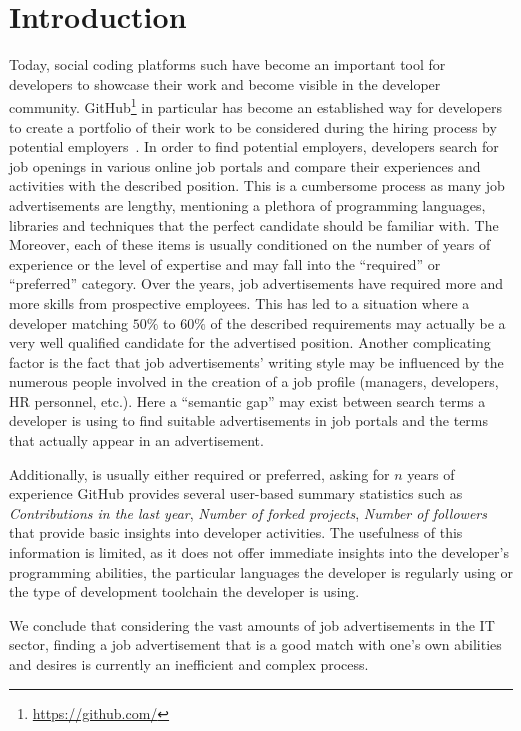 \documentclass{sig-alternate}
\begin{document}


\section{Introduction}


Today, social coding platforms such have become an important tool for developers to showcase their work and become visible in the developer community. GitHub\footnote{\url{https://github.com/}} in particular has become an established way for developers to create a portfolio of their work to be considered during the hiring process by potential employers~\cite{dabbish2012social}. In order to find potential employers, developers search for job openings in various online job portals and compare their experiences and activities with the described position. This is a cumbersome process as many job advertisements are lengthy, mentioning a plethora of programming languages, libraries and techniques that the perfect candidate should be familiar with. The  Moreover, each of these items is usually conditioned on the number of years of experience or the level of expertise and may fall into the ``required'' or ``preferred'' category. Over the years, job advertisements have required more and more skills from prospective employees. This has led to a situation where a developer matching $50\%$ to $60\%$ of the described requirements may actually be a very well qualified candidate for the advertised position. Another complicating factor is the fact that job advertisements' writing style may be influenced by the numerous people involved in the creation of a job profile (managers, developers, HR personnel, etc.). Here a ``semantic gap'' may exist between search terms a developer is using to find suitable advertisements in job portals and the terms that actually appear in an advertisement. 

Additionally,  is usually either required or preferred, asking for $n$ years of experience   GitHub provides several user-based summary statistics such as \emph{Contributions in the last year}, \emph{Number of forked projects}, \emph{Number of followers} that provide basic insights into developer activities. The usefulness of this information is limited, as it does not offer immediate insights into the developer's programming abilities, the particular languages the developer is regularly using or the type of development toolchain the developer is using. 

We conclude that considering the vast amounts of job advertisements in the IT sector, finding a job advertisement that is a good match with one's own abilities and desires is currently an inefficient and complex process. 
\end{document}
